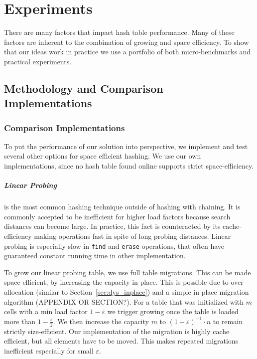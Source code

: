 \documentclass[a4paper,UKenglish]{lipics-v2016}
\begin{document}

\section{Experiments}
\label{sec:exp}
There are many factors that impact hash table performance.  Many of
these factors are inherent to the combination of growing and space
efficiency.  To show that our ideas work in practice we use a
portfolio of both micro-benchmarks and practical experiments.

\subsection{Methodology and Comparison Implementations}

\subsubsection*{Comparison Implementations}
\label{sec:exp_competitors}
To put the performance of our solution into perspective, we
implement and test several other options for space efficient
hashing.  We use our own implementations, since no hash table found
online supports strict space-efficiency.

\subparagraph*{Linear Probing} is the most common hashing technique outside of
hashing with chaining.  It is commonly accepted to be inefficient for
higher load factors because search distances can become large.  In
practice, this fact is counteracted by its cache-efficiency making
operations fast in spite of long probing distances.  Linear probing is
especially slow in \verb~find~ and \verb~erase~ operations, that often have
guaranteed constant running time in other implementation.

To grow our linear probing table, we use full table migrations.  This
can be made space efficient, by increasing the capacity in place.
This is possible due to over allocation (similar to
Section~\ref{sec:dys_inplace}) and a simple in place migration
algorithm (APPENDIX OR SECTION?).  For a table that was
initialized with $m$ cells with a min load factor $1-\varepsilon$ we
trigger growing once the table is loaded more than
$1-\frac{\varepsilon}{2}$. We then increase the capacity $m$ to
$(1-\varepsilon)^{-1}\cdot n$ to remain strictly size-efficient.  Our implementation
of the migration is highly cache efficient, but all elements have to
be moved.  This makes repeated migrations inefficient especially for
small $\varepsilon$.
\end{document}

